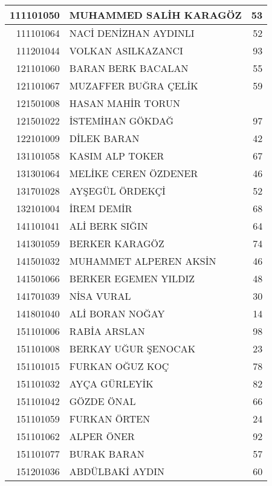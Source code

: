 \documentclass[12pt]{article}
\begin{document}
\begin{multicols}{2}
\begin{longtable}{||r||l||r||}
    \midrule
    111101050 & MUHAMMED SALİH KARAGÖZ & 53 \\
    \midrule
    111101064 & NACİ DENİZHAN AYDINLI & 52 \\
    \midrule
    111201044 & VOLKAN ASILKAZANCI & 93 \\
    \midrule
    121101060 & BARAN BERK BACALAN & \cellcolor[rgb]{ 1,  1,  0} 55 \\
    \midrule
    121101067 & MUZAFFER BUĞRA ÇELİK & 59 \\
    \midrule
    121501008 & HASAN MAHİR TORUN &  \\
    \midrule
    121501022 & İSTEMİHAN GÖKDAĞ & 97 \\
    \midrule
    122101009 & DİLEK BARAN & 42 \\
    \midrule
    131101058 & KASIM ALP TOKER & 67 \\
    \midrule
    131301064 & MELİKE CEREN ÖZDENER & 46 \\
    \midrule
    131701028 & AYŞEGÜL ÖRDEKÇİ & 52 \\
    \midrule
    132101004 & İREM DEMİR & 68 \\
    \midrule
    141101041 & ALİ BERK SIĞIN & 64 \\
    \midrule
    141301059 & BERKER KARAGÖZ & \cellcolor[rgb]{ 1,  1,  0} 74 \\
    \midrule
    141501032 & MUHAMMET ALPEREN AKSİN & 46 \\
    \midrule
    141501066 & BERKER EGEMEN YILDIZ & 48 \\
    \midrule
    141701039 & NİSA VURAL & 30 \\
    \midrule
    141801040 & ALİ BORAN NOĞAY & 14 \\
    \midrule
    151101006 & RABİA ARSLAN & 98 \\
    \midrule
    151101008 & BERKAY UĞUR ŞENOCAK & 23 \\
    \midrule
    151101015 & FURKAN OĞUZ KOÇ & 78 \\
    \midrule
    151101032 & AYÇA GÜRLEYİK & 82 \\
    \midrule
    151101042 & GÖZDE ÖNAL & \cellcolor[rgb]{ 1,  1,  0} 66 \\
    \midrule
    151101059 & FURKAN ÖRTEN & 24 \\
    \midrule
    151101062 & ALPER ÖNER & 92 \\
    \midrule
    151101077 & BURAK BARAN & 57 \\
    \midrule
    151201036 & ABDÜLBAKİ AYDIN & 60 \\

\end{longtable}
\end{multicols}
\end{document}
